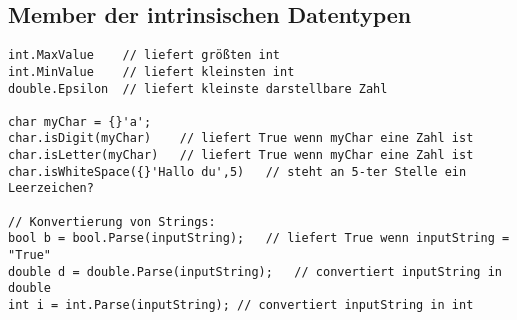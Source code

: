 \subsection{Member der intrinsischen Datentypen}

\begin{lstlisting}[language={[Sharp]C}]
int.MaxValue	// liefert größten int
int.MinValue	// liefert kleinsten int
double.Epsilon	// liefert kleinste darstellbare Zahl

char myChar = {}'a';
char.isDigit(myChar)	// liefert True wenn myChar eine Zahl ist
char.isLetter(myChar)	// liefert True wenn myChar eine Zahl ist
char.isWhiteSpace({}'Hallo du',5)	// steht an 5-ter Stelle ein Leerzeichen?

// Konvertierung von Strings:
bool b = bool.Parse(inputString);	// liefert True wenn inputString = "True"
double d = double.Parse(inputString);	// convertiert inputString in double
int i = int.Parse(inputString);	// convertiert inputString in int
\end{lstlisting}

